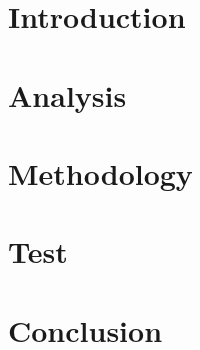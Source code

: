 



\frontmatter 

\cleardoublepage

\cleardoublepage

\cleardoublepage

\setlength\parskip{0ex} %
\tableofcontents* %
\setlength{\parskip}{3mm} %


\mainmatter
{} %
\pagestyle{custom}

\chapter{Introduction}
\label{chap:intro}


\chapter{Analysis}
\label{chap:analysis}


\chapter{Methodology}
\label{chap:methodology}


\chapter{Test}
\label{chap:test}


\chapter{Conclusion}
\label{chap:conclusion}




